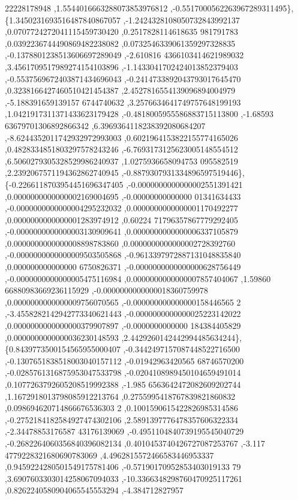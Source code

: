 \begin{DoxyCode}
      22228178948 ,1.5544016663288073853976812 ,-0.5517000562263967289311495\},
\{1.3450231693516487840867057 ,-1.2424328108050732843992137 ,0.0707724272041115459730420 ,0.2517828114618635
      981791783 ,0.0392236744490869482238082 ,0.0732546339061359297328835 ,-0.1378801238513606697289049 ,-2.610816
      4366103414621989032 ,3.4561709517989274154103896 ,-1.1433041702424013852379403 ,-0.5537569672403871434696043
       ,-0.2414733892043793017645470 ,0.3238166427460510421454387 ,2.4527816554139096894004979 ,-5.188391659139157
      6744740632 ,3.2576634641749757648199193 ,1.0421917311371433623179428 ,-0.4818005955586883715113800 ,-1.68593
      63679701306892866342 ,6.3969364118238392080684207 ,-8.6244352011742932972993003 ,0.6021964153822155774165026
       ,0.4828334851803297578243246 ,-6.7693173125623005148554512 ,6.5060279305328529986240937 ,1.0275936658094753
      095582519 ,2.2392067571194362862740945 ,-0.8879307931334896597519446\},
\{-0.2266118703954451696347405 ,-0.0000000000000002551391421 ,0.0000000000000002169004695 ,-0.00000000000000
      01341634433 ,-0.0000000000000004295232032 ,0.0000000000000001170492277 ,0.0000000000000001283974912 ,0.60224
      71796357867779292405 ,-0.0000000000000003130909641 ,0.0000000000000006337105879 ,0.0000000000000008898783860
       ,0.0000000000000002728392760 ,-0.0000000000000009503505868 ,-0.9613397972887131048835840 ,0.000000000000000
      6750826371 ,-0.0000000000000000628756449 ,-0.0000000000000005475116984 ,0.0000000000000007857404067 ,1.59860
      66880983669236115929 ,-0.0000000000000018360759978 ,0.0000000000000009756070565 ,-0.000000000000000158446565
      2 ,-3.4558282142942773340621443 ,-0.0000000000000025223142022 ,0.0000000000000000379907897 ,-0.0000000000000
      184384405829 ,0.0000000000000036230148593 ,2.4429260142442994485634244\},
\{0.8439773500154565955000407 ,-0.3442497157087448522716500 ,-0.1307651838518003040157112 ,-0.01942963420565
      68746570200 ,-0.0285761316875953047533798 ,-0.0204108989450104659491014 ,0.1077263792605208519992388 ,-1.985
      6563642472082609202744 ,1.1672918013798085912213764 ,0.2755995418767839821860832 ,0.098694620714866676536303
      2 ,0.1001590615422826985314586 ,-0.2752184182584927474302106 ,2.5891397776478357606322334 ,-2.34478853176587
      43176139069 ,-0.4951104840739195545040729 ,-0.2682264060356840396082134 ,0.4010453740426727087253767 ,-3.117
      4779228321680690783069 ,4.4962815572466583446953337 ,0.9459224280501549175781406 ,-0.57190170952853403019133
      79 ,3.6907603303014258067094033 ,-10.3366348298760470925117261 ,0.8262240580904065545553294 ,-4.384712827957

\end{DoxyCode}
